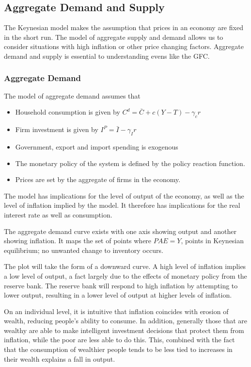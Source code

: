 \documentclass[12pt]{report}
\begin{document}
\begin{flushleft}
\subsection*{Aggregate Demand and Supply}

The Keynesian model makes the assumption that prices in an economy are fixed in
the short run. The model of aggregate supply and demand allows us to consider
situations with high inflation or other price changing factors. Aggregate
demand and supply is essential to understanding evens like the GFC.

\subsubsection*{Aggregate Demand}

The model of aggregate demand assumes that
\begin{itemize}
    \item Household consumption is given by 
        \(C^d = \bar{C} + c(Y - T) - \gamma_cr\)
    \item Firm investment is given by \(I^P = \bar{I} - \gamma_Ir\)
    \item Government, export and import spending is exogenous
    \item The monetary policy of the system is defined by the policy reaction
        function.
    \item Prices are set by the aggregate of firms in the economy.
\end{itemize}
The model has implications for the level of output of the economy, as well as
the level of inflation implied by the model. It therefore has implications for
the real interest rate as well as consumption. \par
The aggregate demand curve exists with one axis showing output and another
showing inflation. It maps the set of points where \(PAE = Y\), points in
Keynesian equilibrium; no unwanted change to inventory occurs. \par
The plot will
take the form of a downward curve. A high level of inflation implies a low
level of output, a fact largely due to the effects of monetary policy from the
reserve bank. The reserve bank will respond to high inflation by attempting to
lower output, resulting in a lower level of output at higher levels of
inflation. \par
On an individual level, it is intuitive that inflation coincides with erosion
of wealth, reducing people's ability to consume. In addition, generally those
that are wealthy are able to make intelligent investment decisions that protect
them from inflation, while the poor are less able to do this. This, combined
with the fact that the consumption of wealthier people tends to be less tied
to increases in their wealth explains a fall in output.


\end{flushleft}
\end{document}
